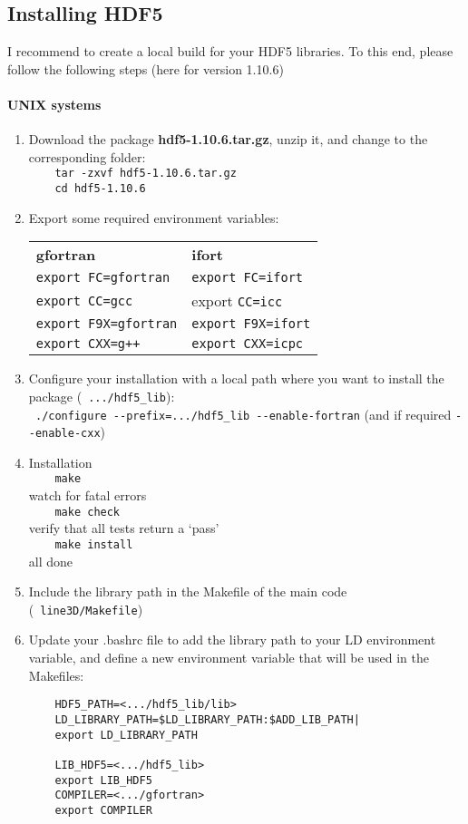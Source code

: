 \documentclass[10pt,a4paper]{article}
\begin{document}
\subsection{Installing HDF5}
\label{subsec:hdf5}
I recommend to create a local build for your HDF5 libraries. To this end, please follow the following steps (here for version 1.10.6)
\paragraph{UNIX systems}
\begin{enumerate}
\item Download the package \textbf{hdf5-1.10.6.tar.gz}, unzip it, and change to the corresponding folder: \\
  \verb|    tar -zxvf hdf5-1.10.6.tar.gz|\\
  \verb|    cd hdf5-1.10.6|
\item Export some required environment variables:\\
    \begin{tabular}{ll}
      \textbf{gfortran}  & \textbf{ifort} \\
      \verb|export FC=gfortran| & \verb|export FC=ifort| \\
      \verb|export CC=gcc| & export \verb|CC=icc| \\
      \verb|export F9X=gfortran| & \verb|export F9X=ifort| \\
      \verb|export CXX=g++| & \verb|export CXX=icpc|
    \end{tabular}
\item Configure your installation with a local path where you want to install the package (\eg~\verb|.../hdf5_lib|):\\
  \verb| ./configure --prefix=.../hdf5_lib --enable-fortran| (and if required \verb|--enable-cxx|)
\item Installation \\
  \verb|    make|\\ 
   watch for fatal errors\\
  \verb|    make check|\\
  verify that all tests return a `pass' \\
  \verb|    make install|\\
   all done
\item Include the library path in the Makefile of the main code (\eg~\verb|line3D/Makefile|)
\item Update your .bashrc file to add the library path to your LD environment variable, and define a new environment variable that will be used in the Makefiles:\\
  \begin{verbatim}
    HDF5_PATH=<.../hdf5_lib/lib>
    LD_LIBRARY_PATH=$LD_LIBRARY_PATH:$ADD_LIB_PATH|
    export LD_LIBRARY_PATH

    LIB_HDF5=<.../hdf5_lib>
    export LIB_HDF5
    COMPILER=<.../gfortran>
    export COMPILER
  \end{verbatim}
\end{enumerate}
\end{document}

